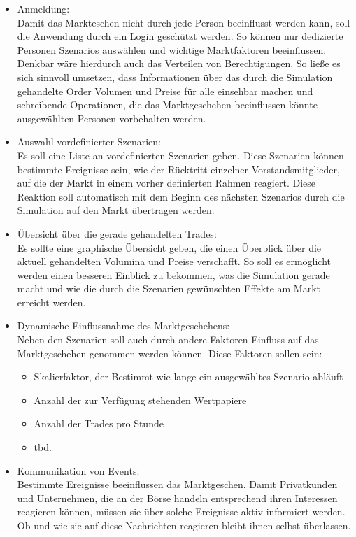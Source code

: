 	\begin{itemize}
		\item Anmeldung: \\
			Damit das Markteschen nicht durch jede Person beeinflusst werden kann, soll die Anwendung durch ein Login geschützt werden. So können nur dedizierte Personen Szenarios auswählen und wichtige Marktfaktoren beeinflussen. Denkbar wäre hierdurch auch das Verteilen von Berechtigungen. So ließe es sich sinnvoll umsetzen, dass Informationen über das durch die Simulation gehandelte Order Volumen und Preise für alle einsehbar machen und schreibende Operationen, die das Marktgeschehen beeinflussen könnte ausgewählten Personen vorbehalten werden.
		
		\item Auswahl vordefinierter Szenarien: \\
			Es soll eine Liste an vordefinierten Szenarien geben. Diese Szenarien können bestimmte Ereignisse sein, wie der Rücktritt einzelner Vorstandsmitglieder, auf die der Markt in einem vorher definierten Rahmen reagiert. Diese Reaktion soll automatisch mit dem Beginn des nächsten Szenarios durch die Simulation auf den Markt übertragen werden.
			
		\item Übersicht über die gerade gehandelten Trades: \\
			Es sollte eine graphische Übersicht geben, die einen Überblick über die aktuell gehandelten Volumina und Preise verschafft. So soll es ermöglicht werden einen besseren Einblick zu bekommen, was die Simulation gerade macht und wie die durch die Szenarien gewünschten Effekte am Markt erreicht werden.
			
		\item Dynamische Einflussnahme des Marktgeschehens: \\
			Neben den Szenarien soll auch durch andere Faktoren Einfluss auf das Marktgeschehen genommen werden können. Diese Faktoren sollen sein:
				\begin{itemize}
					\item Skalierfaktor, der Bestimmt wie lange ein ausgewähltes Szenario abläuft
					\item Anzahl der zur Verfügung stehenden Wertpapiere
					\item Anzahl der Trades pro Stunde
					\item tbd.
				\end{itemize}
			
		\item Kommunikation von Events: \\
			Bestimmte Ereignisse beeinflussen das Marktgeschen. Damit Privatkunden und Unternehmen, die an der Börse handeln entsprechend ihren Interessen reagieren können, müssen sie über solche Ereignisse aktiv informiert werden. Ob und wie sie auf diese Nachrichten reagieren bleibt ihnen selbst überlassen.
			

\end{itemize}
